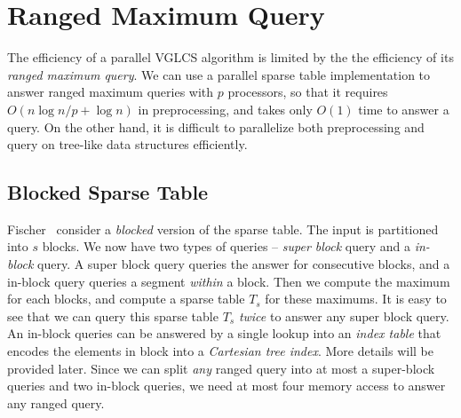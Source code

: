 \section{Ranged Maximum Query} \label{sec:parallelRMQ}


The efficiency of a parallel VGLCS algorithm is limited by the the
efficiency of its {\em ranged maximum query}.  We can use a parallel
sparse table implementation to answer ranged maximum queries with $p$
processors, so that it requires $O(n \log n / p + \log n)$ in
preprocessing, and takes only $O(1)$ time to answer a query.  On the
other hand, it is difficult to parallelize both preprocessing and
query on tree-like data structures efficiently.

\subsection{Blocked Sparse Table}

Fischer~\cite{Fischer2006TheoreticalAP} consider a {\em blocked}
version of the sparse table.  The input is partitioned into $s$ blocks.
We now have two types of queries -- {\em super block} query and a {\em
  in-block} query.  A super block query queries the answer for
consecutive blocks, and a in-block query queries a segment {\em
  within} a block.  Then we compute the maximum for each blocks, and
compute a sparse table $T_s$ for these maximums.  It is easy to see
that we can query this sparse table $T_s$ {\em twice} to answer any
super block query.  An in-block queries can be answered by a single
lookup into an {\em index table} that encodes the elements in block
into a {\em Cartesian tree index}.  More details will be provided
later.  Since we can split {\em any} ranged query into at most a
super-block queries and two in-block queries, we need at most four
memory access to answer any ranged query.

